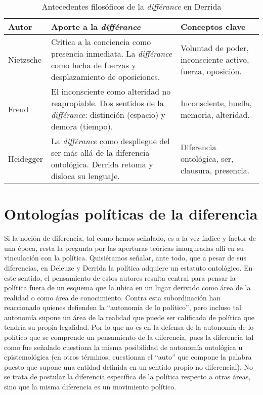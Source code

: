 \begin{table}[!ht]
	\sf\footnotesize\setlength\tabcolsep{4pt}
	\centering
	\begin{tabular}{l | >{\raggedright\arraybackslash}m{3.8cm} | >{\raggedright\arraybackslash}m{4cm}}
		\toprule
		\textbf{Autor} & \textbf{Aporte a la \emph{différance}} & \textbf{Conceptos clave} \\
		\midrule
		Nietzsche &
		Crítica a la conciencia como presencia inmediata. La \emph{différance} como lucha de fuerzas y desplazamiento de oposiciones. &
		Voluntad de poder, inconsciente activo, fuerza, oposición. \\
		\midrule
		Freud &
		El inconsciente como alteridad no reapropiable. Dos sentidos de la \emph{différance}: distinción (espacio) y demora (tiempo). &
		Inconsciente, huella, memoria, alteridad. \\
		\midrule
		Heidegger &
		La \emph{différance} como despliegue del ser más allá de la diferencia ontológica. Derrida retoma y disloca su lenguaje. &
		Diferencia ontológica, ser, clausura, presencia. \\
		\bottomrule
	\end{tabular}
	\caption{Antecedentes filosóficos de la \emph{différance} en Derrida}
	\label{tab: Cuadro 1.2}
\end{table}

\section{Ontologías políticas de la diferencia}

Si la noción de diferencia, tal como hemos señalado, es a la vez índice y factor de una época, resta la pregunta por las aperturas teóricas inauguradas allí en su vinculación con la política. Quisiéramos señalar, ante todo, que a pesar de sus diferencias, en Deleuze y Derrida la política adquiere un estatuto ontológico. En este sentido, el pensamiento de estos autores resulta central para pensar la política fuera de un esquema que la ubica en un lugar derivado como área de la realidad o como área de conocimiento. Contra esta subordinación han reaccionado quienes defienden la \enquote{autonomía de lo político}, pero incluso tal autonomía supone un área de la realidad que puede ser calificada de política que tendría su propia legalidad. Por lo que no es en la defensa de la autonomía de lo político que se comprende un pensamiento de la diferencia, pues la diferencia tal como fue señalado cuestiona la misma posibilidad de autonomía ontológica u epistemológica (en otros términos, cuestionan el \enquote{auto} que compone la palabra puesto que supone una entidad definida en un sentido propio no diferencial). No se trata de postular la diferencia específica de la política respecto a otras áreas, sino que la misma diferencia es un movimiento político.


